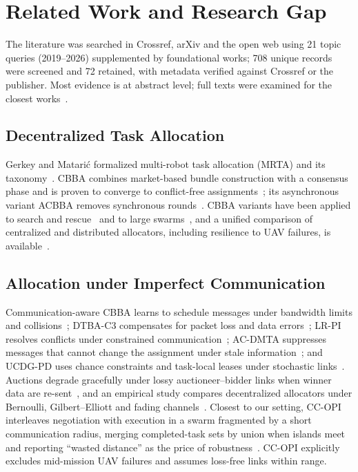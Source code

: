 \documentclass[journal]{IEEEtran}
\begin{document}
\section{Related Work and Research Gap}\label{sec:related}

The literature was searched in Crossref, arXiv and the open web using 21 topic queries (2019--2026) supplemented by foundational works; 708 unique records were screened and 72 retained, with metadata verified against Crossref or the publisher. Most evidence is at abstract level; full texts were examined for the closest works~\cite{R66_liu2026,R67_giacomossi2026,R53_goeckner2024,R34_bramblett2023}.

\subsection{Decentralized Task Allocation}
Gerkey and Matari\'c formalized multi-robot task allocation (MRTA) and its taxonomy~\cite{R01_gerkey2004}. CBBA combines market-based bundle construction with a consensus phase and is proven to converge to conflict-free assignments~\cite{R02_choi2009}; its asynchronous variant ACBBA removes synchronous rounds~\cite{R03_johnson2011}. CBBA variants have been applied to search and rescue~\cite{R31_grntved2023} and to large swarms~\cite{R33_rodriguez2025}, and a unified comparison of centralized and distributed allocators, including resilience to UAV failures, is available~\cite{R30_song2025}.

\subsection{Allocation under Imperfect Communication}
Communication-aware CBBA learns to schedule messages under bandwidth limits and collisions~\cite{R22_raja2022}; DTBA-C3 compensates for packet loss and data errors~\cite{R24_tong2026}; LR-PI resolves conflicts under constrained communication~\cite{R23_yan2024}; AC-DMTA suppresses messages that cannot change the assignment under stale information~\cite{R68_zhao2026}; and UCDG-PD uses chance constraints and task-local leases under stochastic links~\cite{R25_qian2026}. Auctions degrade gracefully under lossy auctioneer--bidder links when winner data are re-sent~\cite{R26_otte2020}, and an empirical study compares decentralized allocators under Bernoulli, Gilbert--Elliott and fading channels~\cite{R27_verma2025}. Closest to our setting, CC-OPI interleaves negotiation with execution in a swarm fragmented by a short communication radius, merging completed-task sets by union when islands meet and reporting ``wasted distance'' as the price of robustness~\cite{R66_liu2026}. CC-OPI explicitly excludes mid-mission UAV failures and assumes loss-free links within range.
\end{document}
